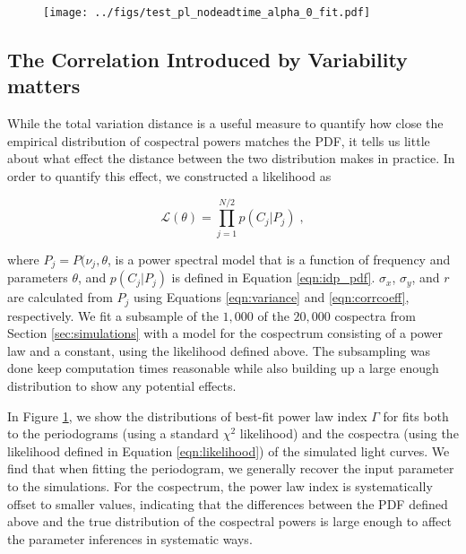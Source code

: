 \documentclass[fleqn,usenatbib]{mnras}
\begin{document}
\begin{figure}
\begin{center}
\texttt{[image: ../figs/test\_pl\_nodeadtime\_alpha\_0\_fit.pdf]}
\caption{}
\label{fig:plfit}
\end{center}
\end{figure}



\subsection{The Correlation Introduced by Variability matters}

While the total variation distance is a useful measure to quantify how close the empirical distribution of cospectral powers matches the PDF, it tells us little about what effect the distance between the two distribution makes in practice. In order to quantify this effect, we constructed a likelihood as

\begin{equation}
\label{eqn:likelihood}
\mathcal{L}(\theta) = \prod_{j=1}^{N/2}p(C_j | P_j) \; ,
\end{equation}

\noindent where $P_j = P(\nu_j, \theta$, is a power spectral model that is a function of frequency and parameters $\theta$, and $p(C_j | P_j)$ is defined in Equation \ref{eqn:idp_pdf}. $\sigma_x$, $\sigma_y$, and $r$ are calculated from $P_j$ using Equations \ref{eqn:variance} and \ref{eqn:corrcoeff}, respectively. We fit a subsample of the $1,000$ of the $20,000$ cospectra from Section \ref{sec:simulations} with a model for the cospectrum consisting of a power law and a constant, using the likelihood defined above. The subsampling was done keep computation times reasonable while also building up a large enough distribution to show any potential effects. 

In Figure \ref{fig:plfit}, we show the distributions of best-fit power law index $\Gamma$ for fits both to the periodograms (using a standard $\chi^2$ likelihood) and the cospectra (using the likelihood defined in Equation \ref{eqn:likelihood}) of the simulated light curves. We find that when fitting the periodogram, we generally recover the input parameter to the simulations. For the cospectrum, the power law index is systematically offset to smaller values, indicating that the differences between the PDF defined above and the true distribution of the cospectral powers is large enough to affect the parameter inferences in systematic ways.
\end{document}
